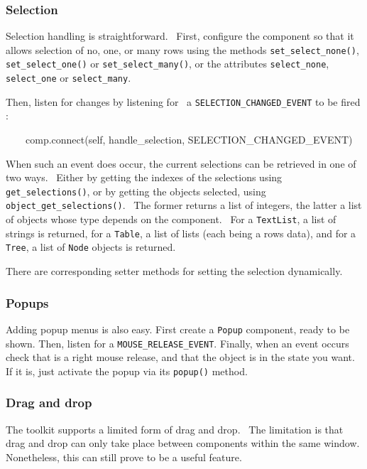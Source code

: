 \subsubsection{Selection}

Selection handling is straightforward. \ First, configure the component
so that it allows selection of no, one, or many rows using the methods
\texttt{set\_select\_none()}, \texttt{set\_select\_one()} or
\texttt{set\_select\_many()}, or the attributes
\texttt{{\textquotedbl}select\_none{\textquotedbl}},
\texttt{{\textquotedbl}select\_one{\textquotedbl}} or
\texttt{{\textquotedbl}select\_many{\textquotedbl}}.

Then, listen for changes by listening for \ a
\texttt{SELECTION\_CHANGED\_EVENT} to be fired :

{\sffamily
\ \ \ \ comp.connect(self,
{\textquotedbl}handle\_selection{\textquotedbl},
SELECTION\_CHANGED\_EVENT)}

When such an event does occur, the current selections can be retrieved
in one of two ways. \ Either by getting the indexes of the selections
using \texttt{get\_selections()}, or by getting the objects selected,
using \texttt{object\_get\_selections()}. \ The former returns a list
of integers, the latter a list of objects whose type depends on the
component. \ For a \texttt{TextList}, a list of strings is returned,
for a \texttt{Table}, a list of lists (each being a
row{\textquotesingle}s data), and for a \texttt{Tree}, a list of
\texttt{Node} objects is returned.

There are corresponding setter methods for setting the selection
dynamically.

\subsubsection{Popups}

Adding popup menus is also easy. First create a \texttt{Popup}
component, ready to be shown. Then, listen for a
\texttt{MOUSE\_RELEASE\_EVENT}. Finally, when an event occurs check
that is a right mouse release, and that the object is in the state you
want. If it is, just activate the popup via its \texttt{popup()}
method.

\subsubsection{Drag and drop}

The toolkit supports a limited form of drag and drop. \ The limitation
is that drag and drop can only take place between components within the
same window. Nonetheless, this can still prove to be a useful feature.

